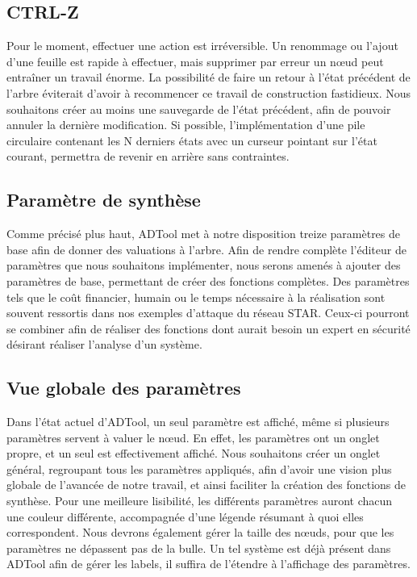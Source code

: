 	\subsection{CTRL-Z}
	Pour le moment, effectuer une action est irréversible. Un renommage ou l'ajout d'une feuille est rapide à effectuer, mais supprimer par erreur un nœud peut entraîner un travail énorme. La possibilité de faire un retour à l'état précédent de l'arbre éviterait d'avoir à recommencer ce travail de construction fastidieux. Nous souhaitons créer au moins une sauvegarde de l'état précédent, afin de pouvoir annuler la dernière modification. Si possible, l'implémentation d'une pile circulaire contenant les N derniers états avec un curseur pointant sur l'état courant, permettra de revenir en arrière sans contraintes.
	
	\subsection{Paramètre de synthèse}
	Comme précisé plus haut, ADTool met à notre disposition treize paramètres de base afin de donner des valuations à l'arbre. Afin de rendre complète l'éditeur de paramètres que nous souhaitons implémenter, nous serons amenés à ajouter des paramètres de base, permettant de créer des fonctions complètes. Des paramètres tels que le coût financier, humain ou le temps nécessaire à la réalisation sont souvent ressortis dans nos exemples d'attaque du réseau STAR. Ceux-ci pourront se combiner afin de réaliser des fonctions dont aurait besoin un expert en sécurité désirant réaliser l'analyse d'un système.
		
	\subsection{Vue globale des paramètres}
	Dans l'état actuel d'ADTool, un seul paramètre est affiché, même si plusieurs paramètres servent à valuer le nœud. En effet, les paramètres ont un onglet propre, et un seul est effectivement affiché. Nous souhaitons créer un onglet général, regroupant tous les paramètres appliqués, afin d'avoir une vision plus globale de l'avancée de notre travail, et ainsi faciliter la création des fonctions de synthèse.
	Pour une meilleure lisibilité, les différents paramètres auront chacun une couleur différente, accompagnée d'une légende résumant à quoi elles correspondent.
	Nous devrons également gérer la taille des nœuds, pour que les paramètres ne dépassent pas de la bulle. Un tel système est déjà présent dans ADTool afin de gérer les labels, il suffira de l'étendre à l'affichage des paramètres.
